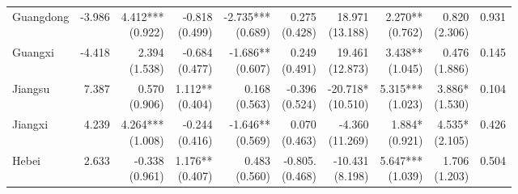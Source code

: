 \documentclass[12pt]{article}
\begin{document}
\begin{landscape}
\begin{small}
\begin{longtable}{lrrrrrrrrr}
    Guangdong & -3.986 & \makecell[r]{4.412***\\(0.922)} & \makecell[r]{-0.818\\(0.499)} & \makecell[r]{-2.735***\\(0.689)} & \makecell[r]{0.275\\(0.428)} & \makecell[r]{18.971\\(13.188)} & \makecell[r]{2.270**\\(0.762)} & \makecell[r]{0.820\\(2.306)} & 0.931 \\
    Guangxi & -4.418 & \makecell[r]{2.394\\(1.538)} & \makecell[r]{-0.684\\(0.477)} & \makecell[r]{-1.686**\\(0.607)} & \makecell[r]{0.249\\(0.491)} & \makecell[r]{19.461\\(12.873)} & \makecell[r]{3.438**\\(1.045)} & \makecell[r]{0.476\\(1.886)} & 0.145 \\
    Jiangsu & 7.387 & \makecell[r]{0.570\\(0.906)} & \makecell[r]{1.112**\\(0.404)} & \makecell[r]{0.168\\(0.563)} & \makecell[r]{-0.396\\(0.524)} & \makecell[r]{-20.718*\\(10.510)} & \makecell[r]{5.315***\\(1.023)} & \makecell[r]{3.886*\\(1.530)} & 0.104 \\
    Jiangxi & 4.239 & \makecell[r]{4.264***\\(1.008)} & \makecell[r]{-0.244\\(0.416)} & \makecell[r]{-1.646**\\(0.569)} & \makecell[r]{0.070\\(0.463)} & \makecell[r]{-4.360\\(11.269)} & \makecell[r]{1.884*\\(0.921)} & \makecell[r]{4.535*\\(2.105)} & 0.426 \\
    Hebei & 2.633 & \makecell[r]{-0.338\\(0.961)} & \makecell[r]{1.176**\\(0.407)} & \makecell[r]{0.483\\(0.560)} & \makecell[r]{-0.805.\\(0.468)} & \makecell[r]{-10.431\\(8.198)} & \makecell[r]{5.647***\\(1.039)} & \makecell[r]{1.706\\(1.203)} & 0.504 \\

\end{longtable}
\end{small}
\end{landscape}
\end{document}
